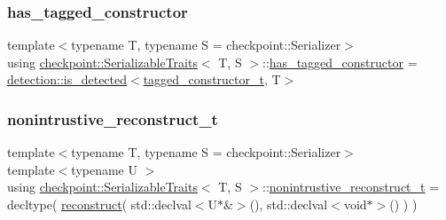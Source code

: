 \subsubsection{\texorpdfstring{has\+\_\+tagged\+\_\+constructor}{has\_tagged\_constructor}}
{\footnotesize\ttfamily template$<$typename T, typename S = checkpoint\+::\+Serializer$>$ \\
using \hyperlink{structcheckpoint_1_1_serializable_traits}{checkpoint\+::\+Serializable\+Traits}$<$ T, S $>$\+::\hyperlink{structcheckpoint_1_1_serializable_traits_a3388d17f4748bf899e063b3d05e0dbe4}{has\+\_\+tagged\+\_\+constructor} =  \hyperlink{namespacedetection_a30893549a3de1e9603d78dad6d5dce92}{detection\+::is\+\_\+detected}$<$\hyperlink{structcheckpoint_1_1_serializable_traits_a5a1f289a5008468335f22e288a96d861}{tagged\+\_\+constructor\+\_\+t}, T$>$}

\mbox{\label{structcheckpoint_1_1_serializable_traits_abe5231bdf561e55fd9e0673e42a8a96c}} 
\subsubsection{\texorpdfstring{nonintrustive\+\_\+reconstruct\+\_\+t}{nonintrustive\_reconstruct\_t}}
{\footnotesize\ttfamily template$<$typename T, typename S = checkpoint\+::\+Serializer$>$ \\
template$<$typename U $>$ \\
using \hyperlink{structcheckpoint_1_1_serializable_traits}{checkpoint\+::\+Serializable\+Traits}$<$ T, S $>$\+::\hyperlink{structcheckpoint_1_1_serializable_traits_abe5231bdf561e55fd9e0673e42a8a96c}{nonintrustive\+\_\+reconstruct\+\_\+t} =  decltype( \hyperlink{namespacecheckpoint_a6254f2e220f905a2b0c797c08092a7a1}{reconstruct}( std\+::declval$<$U$\ast$\&$>$(), std\+::declval$<$void$\ast$$>$() ) )}

\mbox{\label{structcheckpoint_1_1_serializable_traits_a3284d2cfd29cfe429d5cf76186d3fe3c}} 
